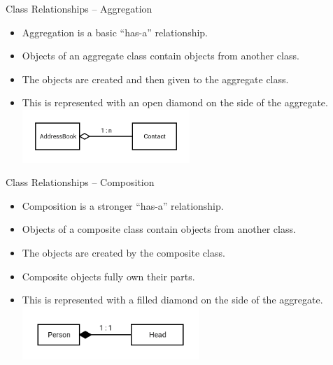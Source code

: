 \documentclass[]{beamer}
\begin{document}
\begin{frame}{Class Relationships -- Aggregation}
    \begin{itemize}[<+->]
        \item Aggregation is a basic ``has-a'' relationship.
        \item Objects of an aggregate class contain objects from
            another class.
        \item The objects are created and then given to the aggregate
            class.
        \item This is represented with an open diamond on the side of
            the aggregate.
            \newline\includegraphics[height=2cm]{images/uml-aggregate}
    \end{itemize}
\end{frame}

\begin{frame}{Class Relationships -- Composition}
    \begin{itemize}[<+->]
        \item Composition is a stronger ``has-a'' relationship.
        \item Objects of a composite class contain objects from
            another class.
        \item The objects are created by the composite class.
        \item Composite objects fully own their parts.
        \item This is represented with a filled diamond on the side of
            the aggregate.
            \newline\includegraphics[height=2cm]{images/uml-composite}
    \end{itemize}
\end{frame}
\end{document}

